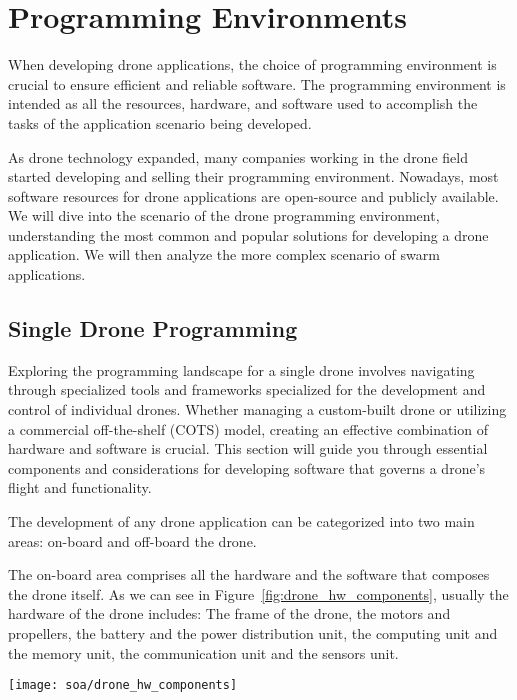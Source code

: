 \section{Programming Environments}\label{sec:soa_programming_environments}
When developing drone applications, the choice of programming environment is crucial to ensure efficient and reliable software.
The programming environment is intended as all the resources, hardware, and software used to accomplish the tasks of the 
application scenario being developed.

As drone technology expanded, many companies working in the drone field started developing and selling their programming environment. 
Nowadays, most software resources for drone applications are open-source and publicly available. 
We will dive into the scenario of the drone programming environment, understanding the most common and popular solutions 
for developing a drone application. We will then analyze the more complex scenario of swarm applications.

\subsection{Single Drone Programming}\label{subsec:programming_environments_single}
Exploring the programming landscape for a single drone involves navigating through specialized tools and 
frameworks specialized for the development and control of individual drones. 
Whether managing a custom-built drone or utilizing a commercial off-the-shelf (COTS) model, 
creating an effective combination of hardware and software is crucial. 
This section will guide you through essential components and considerations for developing software that governs a 
drone's flight and functionality.

The development of any drone application can be categorized into two main areas: on-board and off-board the drone.

The on-board area comprises all the hardware and the software that composes the drone itself. 
As we can see in Figure~\ref{fig:drone_hw_components}, usually the hardware of the drone includes: 
The frame of the drone, the motors and propellers, the battery and the power distribution unit, the computing unit and the memory unit,
the communication unit and the sensors unit.

\begin{SCfigure}[\sidecaptionrelwidth][h]
    \texttt{[image: soa/drone\_hw\_components]}
    \caption[Drone hardware components]{The main hardware components of a drone are: 1. drone's frame, 2. motors, 3. propellers, 4. motor mount, 5. battery, 6. power distribution unit, 7. computing and memory unit, 8. communication unit, 9. sensors unit }
    \label{fig:drone_hw_components}
\end{SCfigure}

